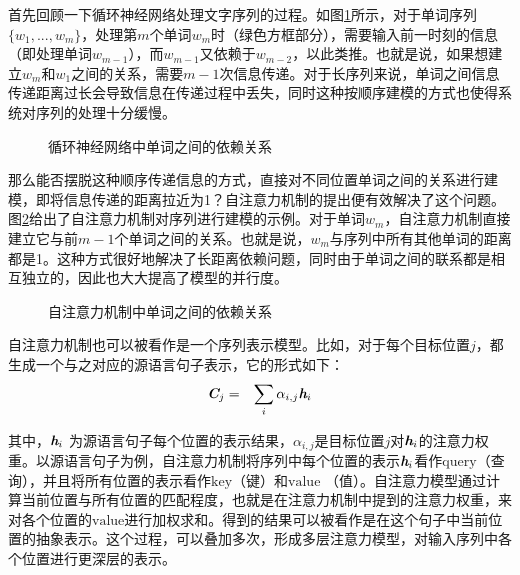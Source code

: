 \parinterval 首先回顾一下循环神经网络处理文字序列的过程。如图\ref{fig:12-1}所示，对于单词序列$\{ w_1,...,w_m \}$，处理第$m$个单词$w_m$时（绿色方框部分），需要输入前一时刻的信息（即处理单词$w_{m-1}$），而$w_{m-1}$又依赖于$w_{m-2}$，以此类推。也就是说，如果想建立$w_m$和$w_1$之间的关系，需要$m-1$次信息传递。对于长序列来说，单词之间信息传递距离过长会导致信息在传递过程中丢失，同时这种按顺序建模的方式也使得系统对序列的处理十分缓慢。

\begin{figure}[htp]
\centering

\caption{循环神经网络中单词之间的依赖关系}
\label{fig:12-1}
\end{figure}

\parinterval 那么能否摆脱这种顺序传递信息的方式，直接对不同位置单词之间的关系进行建模，即将信息传递的距离拉近为1？自注意力机制的提出便有效解决了这个问题。图\ref{fig:12-2}给出了自注意力机制对序列进行建模的示例。对于单词$w_m$，自注意力机制直接建立它与前$m-1$个单词之间的关系。也就是说，$w_m$与序列中所有其他单词的距离都是1。这种方式很好地解决了长距离依赖问题，同时由于单词之间的联系都是相互独立的，因此也大大提高了模型的并行度。

\begin{figure}[htp]
\centering

\caption{自注意力机制中单词之间的依赖关系}
\label{fig:12-2}
\end{figure}

\parinterval 自注意力机制也可以被看作是一个序列表示模型。比如，对于每个目标位置$j$，都生成一个与之对应的源语言句子表示，它的形式如下：
\begin{eqnarray}
\textbf{\em C}_j & = & \sum_i \alpha_{i,j}\textbf{\em h}_i
\label{eq:12-1}
\end{eqnarray}

\noindent 其中，$\textbf{\em h}_i$ 为源语言句子每个位置的表示结果，$\alpha_{i,j}$是目标位置$j$对$\textbf{\em h}_i$的注意力权重。以源语言句子为例，自注意力机制将序列中每个位置的表示$\textbf{\em h}_i$看作$\mathrm{query}$（查询），并且将所有位置的表示看作$\mathrm{key}$（键）和$\mathrm{value}$ （值）。自注意力模型通过计算当前位置与所有位置的匹配程度，也就是在注意力机制中提到的注意力权重，来对各个位置的$\mathrm{value}$进行加权求和。得到的结果可以被看作是在这个句子中当前位置的抽象表示。这个过程，可以叠加多次，形成多层注意力模型，对输入序列中各个位置进行更深层的表示。

